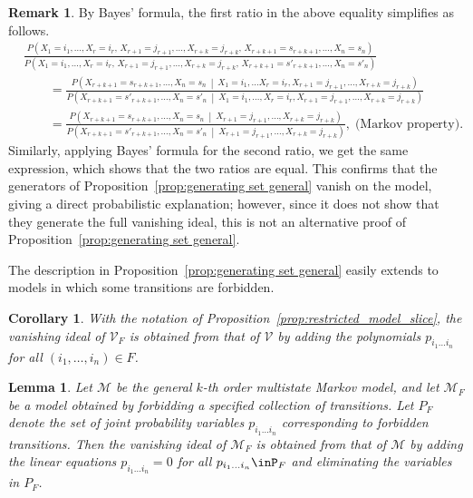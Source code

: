 \documentclass[11pt, a4paper]{article}
\numberwithin{equation}{section}
\theoremstyle{plain}
\newtheorem{corollary}[theorem]{Corollary}
\newtheorem{lemma}[theorem]{Lemma}
\theoremstyle{definition}
\newtheorem{remark}[theorem]{Remark}
\begin{document}
\begin{remark}
By Bayes' formula, the first ratio in the above equality simplifies as follows. 
\begin{align*} &
\frac{
P\!\left(
X_1=i_1,\ldots,X_r=i_r,\,
X_{r+1}=j_{r+1},\ldots,X_{r+k}=j_{r+k},\,
X_{r+k+1}=s_{r+k+1},\ldots,X_n=s_n
\right)}
{
P\!\left(
X_1=i_1,\ldots,X_r=i_r,\,
X_{r+1}=j_{r+1},\ldots,X_{r+k}=j_{r+k},\,
X_{r+k+1}=s'_{r+k+1},\ldots,X_n=s'_n
\right)} \\ 
& \qquad = \frac{
P\!\left(
X_{r+k+1}=s_{r+k+1},\ldots,X_n=s_n
\ \middle|\  X_1 = i_1, \ldots X_r = i_r,
X_{r+1}=j_{r+1},\ldots,X_{r+k}=j_{r+k}
\right)}
{
P\!\left(
X_{r+k+1}=s'_{r+k+1},\ldots,X_n=s'_n
\ \middle|\  X_1 = i_1, \ldots, X_r = i_r,
X_{r+1}=j_{r+1},\ldots,X_{r+k}=j_{r+k}
\right)} & \\ 
 & \qquad=
\frac{
P\!\left(
X_{r+k+1}=s_{r+k+1},\ldots,X_n=s_n
\ \middle|\ 
X_{r+1}=j_{r+1},\ldots,X_{r+k}=j_{r+k}
\right)}
{
P\!\left(
X_{r+k+1}=s'_{r+k+1},\ldots,X_n=s'_n
\ \middle|\ 
X_{r+1}=j_{r+1},\ldots,X_{r+k}=j_{r+k}
\right)}, \; \text{(Markov property).} &
\end{align*}
Similarly, applying Bayes' formula for the second ratio, we get the same expression, which shows that the two ratios are equal. This confirms that the generators of Proposition~\ref{prop:generating set general} vanish on the model, giving a direct probabilistic explanation; however, since it does not show that they generate the full vanishing ideal, this is not an alternative proof of Proposition~\ref{prop:generating set general}. 
\end{remark}



The description in Proposition~\ref{prop:generating set general} easily extends to models in which some transitions are forbidden.



\begin{corollary}
\label{lem:generators_restricted}
With the notation of Proposition~\ref{prop:restricted_model_slice}, the vanishing
ideal of $\mathcal{V}_F$ is obtained from that of $\mathcal{V}$ by adding the polynomials
$p_{i_1 \ldots i_n}$  for all $(i_1,\ldots,i_n) \in F$. 
\end{corollary}


\begin{lemma}
\label{lem:generators_restricted}
Let $\mathcal{M}$ be the general $k$-th order multistate Markov model, and let
$\mathcal{M}_F$ be a model obtained by forbidding a specified collection of transitions.
Let $P_F$ denote the set of joint probability variables
$p_{i_1 \ldots i_n}$ corresponding to forbidden transitions.
Then the vanishing ideal of $\mathcal{M}_F$ is obtained from that of $\mathcal{M}$ by
adding the linear equations $p_{i_1 \ldots i_n}=0$ for all
$p_{i_1 \ldots i_n}\inP_F$ and eliminating the variables in $P_F$.
\end{lemma}
\fi
\end{document}
